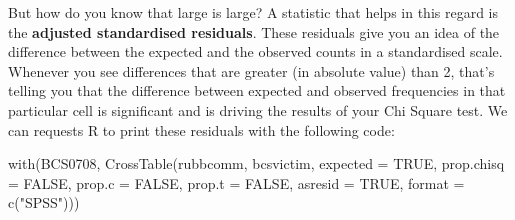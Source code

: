 \documentclass[
]{book}
\newenvironment{Shaded}{\begin{snugshade}}{\end{snugshade}}
\newcommand{\AttributeTok}[1]{\textcolor[rgb]{0.77,0.63,0.00}{#1}}
\newcommand{\ConstantTok}[1]{\textcolor[rgb]{0.00,0.00,0.00}{#1}}
\newcommand{\FunctionTok}[1]{\textcolor[rgb]{0.00,0.00,0.00}{#1}}
\newcommand{\NormalTok}[1]{#1}
\newcommand{\StringTok}[1]{\textcolor[rgb]{0.31,0.60,0.02}{#1}}
\begin{document}
But how do you know that large is large? A statistic that helps in this regard is the \textbf{adjusted standardised residuals}. These residuals give you an idea of the difference between the expected and the observed counts in a standardised scale. Whenever you see differences that are greater (in absolute value) than 2, that's telling you that the difference between expected and observed frequencies in that particular cell is significant and is driving the results of your Chi Square test. We can requests R to print these residuals with the following code:

\begin{Shaded}
\begin{Highlighting}[]
\FunctionTok{with}\NormalTok{(BCS0708, }\FunctionTok{CrossTable}\NormalTok{(rubbcomm, bcsvictim, }\AttributeTok{expected =} \ConstantTok{TRUE}\NormalTok{, }\AttributeTok{prop.chisq =} \ConstantTok{FALSE}\NormalTok{, }\AttributeTok{prop.c =} \ConstantTok{FALSE}\NormalTok{,  }\AttributeTok{prop.t =} \ConstantTok{FALSE}\NormalTok{, }\AttributeTok{asresid =} \ConstantTok{TRUE}\NormalTok{, }\AttributeTok{format =} \FunctionTok{c}\NormalTok{(}\StringTok{"SPSS"}\NormalTok{))) }
\end{Highlighting}
\end{Shaded}
\end{document}
